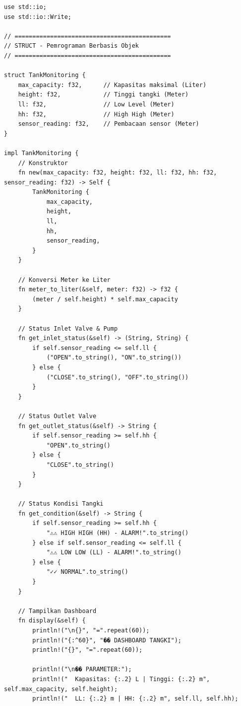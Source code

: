 \documentclass[12pt,a4paper]{article}
\begin{document}
\begin{lstlisting}[caption=Implementasi Lengkap Sistem Monitoring Tangki dalam Rust]
use std::io;
use std::io::Write;

// ============================================
// STRUCT - Pemrograman Berbasis Objek
// ============================================

struct TankMonitoring {
    max_capacity: f32,      // Kapasitas maksimal (Liter)
    height: f32,            // Tinggi tangki (Meter)
    ll: f32,                // Low Level (Meter)
    hh: f32,                // High High (Meter)
    sensor_reading: f32,    // Pembacaan sensor (Meter)
}

impl TankMonitoring {
    // Konstruktor
    fn new(max_capacity: f32, height: f32, ll: f32, hh: f32, sensor_reading: f32) -> Self {
        TankMonitoring {
            max_capacity,
            height,
            ll,
            hh,
            sensor_reading,
        }
    }
    
    // Konversi Meter ke Liter
    fn meter_to_liter(&self, meter: f32) -> f32 {
        (meter / self.height) * self.max_capacity
    }
    
    // Status Inlet Valve & Pump
    fn get_inlet_status(&self) -> (String, String) {
        if self.sensor_reading <= self.ll {
            ("OPEN".to_string(), "ON".to_string())
        } else {
            ("CLOSE".to_string(), "OFF".to_string())
        }
    }
    
    // Status Outlet Valve
    fn get_outlet_status(&self) -> String {
        if self.sensor_reading >= self.hh {
            "OPEN".to_string()
        } else {
            "CLOSE".to_string()
        }
    }
    
    // Status Kondisi Tangki
    fn get_condition(&self) -> String {
        if self.sensor_reading >= self.hh {
            "⚠⚠ HIGH HIGH (HH) - ALARM!".to_string()
        } else if self.sensor_reading <= self.ll {
            "⚠⚠ LOW LOW (LL) - ALARM!".to_string()
        } else {
            "✓✓ NORMAL".to_string()
        }
    }
    
    // Tampilkan Dashboard
    fn display(&self) {
        println!("\n{}", "=".repeat(60));
        println!("{:^60}", "�� DASHBOARD TANGKI");
        println!("{}", "=".repeat(60));
        
        println!("\n�� PARAMETER:");
        println!("  Kapasitas: {:.2} L | Tinggi: {:.2} m", self.max_capacity, self.height);
        println!("  LL: {:.2} m | HH: {:.2} m", self.ll, self.hh);
        

\end{lstlisting}
\end{document}
